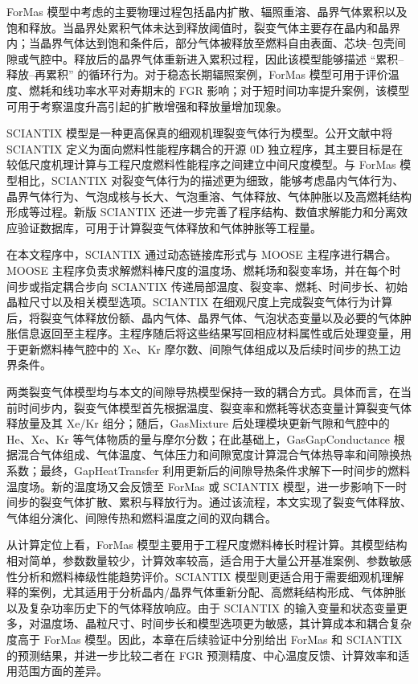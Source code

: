 ForMas 模型中考虑的主要物理过程包括晶内扩散、辐照重溶、晶界气体累积以及饱和释放。当晶界处累积气体未达到释放阈值时，裂变气体主要存在晶内和晶界内；当晶界气体达到饱和条件后，部分气体被释放至燃料自由表面、芯块--包壳间隙或气腔中。释放后的晶界气体重新进入累积过程，因此该模型能够描述 ``累积--释放--再累积'' 的循环行为。对于稳态长期辐照案例，ForMas 模型可用于评价温度、燃耗和线功率水平对寿期末的 FGR 影响；对于短时间功率提升案例，该模型可用于考察温度升高引起的扩散增强和释放量增加现象。

SCIANTIX 模型是一种更高保真的细观机理裂变气体行为模型。公开文献中将 SCIANTIX 定义为面向燃料性能程序耦合的开源 0D 独立程序，其主要目标是在较低尺度机理计算与工程尺度燃料性能程序之间建立中间尺度模型。与 ForMas 模型相比，SCIANTIX 对裂变气体行为的描述更为细致，能够考虑晶内气体行为、晶界气体行为、气泡成核与长大、气泡重溶、气体释放、气体肿胀以及高燃耗结构形成等过程。新版 SCIANTIX 还进一步完善了程序结构、数值求解能力和分离效应验证数据库，可用于计算裂变气体释放和气体肿胀等工程量。

在本文程序中，SCIANTIX 通过动态链接库形式与 MOOSE 主程序进行耦合。MOOSE 主程序负责求解燃料棒尺度的温度场、燃耗场和裂变率场，并在每个时间步或指定耦合步向 SCIANTIX 传递局部温度、裂变率、燃耗、时间步长、初始晶粒尺寸以及相关模型选项。SCIANTIX 在细观尺度上完成裂变气体行为计算后，将裂变气体释放份额、晶内气体、晶界气体、气泡状态变量以及必要的气体肿胀信息返回至主程序。主程序随后将这些结果写回相应材料属性或后处理变量，用于更新燃料棒气腔中的 Xe、Kr 摩尔数、间隙气体组成以及后续时间步的热工边界条件。

两类裂变气体模型均与本文的间隙导热模型保持一致的耦合方式。具体而言，在当前时间步内，裂变气体模型首先根据温度、裂变率和燃耗等状态变量计算裂变气体释放量及其 Xe/Kr 组分；随后，GasMixture 后处理模块更新气隙和气腔中的 He、Xe、Kr 等气体物质的量与摩尔分数；在此基础上，GasGapConductance 根据混合气体组成、气体温度、气体压力和间隙宽度计算混合气体热导率和间隙换热系数；最终，GapHeatTransfer 利用更新后的间隙导热条件求解下一时间步的燃料温度场。新的温度场又会反馈至 ForMas 或 SCIANTIX 模型，进一步影响下一时间步的裂变气体扩散、累积与释放行为。通过该流程，本文实现了裂变气体释放、气体组分演化、间隙传热和燃料温度之间的双向耦合。

从计算定位上看，ForMas 模型主要用于工程尺度燃料棒长时程计算。其模型结构相对简单，参数数量较少，计算效率较高，适合用于大量公开基准案例、参数敏感性分析和燃料棒级性能趋势评价。SCIANTIX 模型则更适合用于需要细观机理解释的案例，尤其适用于分析晶内/晶界气体重新分配、高燃耗结构形成、气体肿胀以及复杂功率历史下的气体释放响应。由于 SCIANTIX 的输入变量和状态变量更多，对温度场、晶粒尺寸、时间步长和模型选项更为敏感，其计算成本和耦合复杂度高于 ForMas 模型。因此，本章在后续验证中分别给出 ForMas 和 SCIANTIX 的预测结果，并进一步比较二者在 FGR 预测精度、中心温度反馈、计算效率和适用范围方面的差异。

